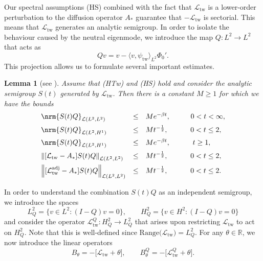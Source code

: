 \documentclass[10pt]{articleHJ}
\renewcommand{\b}{\ensuremath{\beta}}
\renewcommand{\L}{\ensuremath{\mathcal{L}}}
\DeclarePairedDelimiter{\nrm}\lVert\rVert
\newcommand{\Real}{\mathbb{R}}							%
\newcommand{\norm}[1]{\left\Vert#1\right\Vert}		%
\newtheorem{lem}[thm]{Lemma}
\numberwithin{equation}{section}
\begin{document}
Our spectral assumptions (HS) combined
with the fact that $\mathcal{L}_{\mathrm{tw}}$
is a lower-order perturbation to
the diffusion operator $A_*$
guarantee that $-\mathcal{L}_{\mathrm{tw}}$
is sectorial. This means that
$\mathcal{L}_{\mathrm{tw}}$ generates
an analytic semigroup. In order
to isolate the behaviour caused by the neutral eigenmode,
we introduce the map
$Q: L^2 \to L^2$ that acts as
\begin{equation}
Q v = v - \langle v, \psi_{\mathrm{tw}} \rangle_{L^2} \Phi_0' .
\end{equation}
This projection allows us to formulate
several important estimates.
%
\begin{lem}[see \cite{lorenzi2004analytic}]
\label{lem:nls:sem:group:decay}
Assume that (HTw) and (HS) hold and consider
the analytic  semigroup $S(t)$
generated by $\mathcal{L}_{\mathrm{tw}}$.
Then there is a constant $M\geq 1$ for which
we have the bounds
\begin{equation}
\begin{array}{lcl}
\nrm{S(t)Q}_{\L(L^2,L^2)}&\leq& M e^{-\b t}, \hspace{1cm} 0<t<\infty ,
  \\[0.2cm]
\nrm{S(t)Q}_{\L(L^2,H^1)}&\leq& M t^{-\frac{1}{2}}, \hspace{1.1cm} 0<t\leq 2 ,
\\[0.2cm]
\nrm{S(t)Q}_{\L(L^2,H^1)}&\leq& M e^{-\b t}, \hspace{1.1cm} t\geq 1,
\\[0.2cm]
\norm{[\mathcal{L}_\mathrm{tw} - A_*] S(t)Q}_{\L(L^2,L^2) }
  & \le & M t^{-\frac{1}{2}}, \hspace{1.1cm} 0 < t\leq 2,
\\[0.2cm]
\norm{[\mathcal{L}^{\mathrm{adj}}_\mathrm{tw} - A_*] S(t)Q }_{\L(L^2,L^2) }
  & \le & M t^{-\frac{1}{2}}, \hspace{1.1cm} 0 < t\leq 2 .
\end{array}
\end{equation}
\end{lem}

In order to understand the combination $S(t) Q$
as an independent semigroup,
we introduce the spaces
\begin{equation}
L^2_Q = \{ v \in L^2: (I - Q) v = 0 \},
\qquad
H^2_Q = \{ v \in H^2: (I-Q) v = 0 \}
\end{equation}
and consider the operator $\mathcal{L}_{\mathrm{tw}}^Q: H^2_Q \to L^2_Q$
that arises upon restricting $\mathcal{L}_{\mathrm{tw}}$
to act on $H^2_Q$. Note that this is well-defined
since $\mathrm{Range} \big( \mathcal{L}_{\mathrm{tw}} \big)
   = L^2_Q$.
For any $\theta \in \Real$,
we now introduce the linear operators
\begin{equation}
B_{\theta} = -\big[ \mathcal{L}_{\mathrm{tw}} + \theta \big],
\qquad
B^Q_{\theta} = -\big[ \mathcal{L}_{\mathrm{tw}}^Q + \theta \big].
\end{equation}
\end{document}
